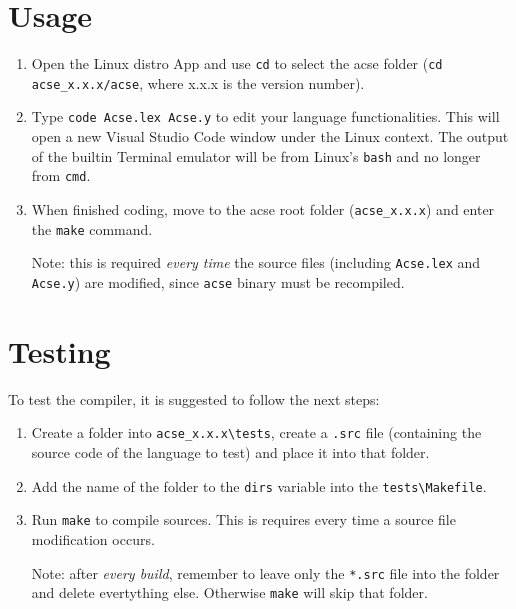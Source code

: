 \documentclass{article}
\begin{document}
\section{Usage}
\begin{enumerate}
  \item Open the Linux distro App and use \verb+cd+ to select the acse folder (\verb+cd acse_x.x.x/acse+, where x.x.x is the version number).
  \item Type \verb+code Acse.lex Acse.y+ to edit your language functionalities. This will open a new Visual Studio Code window under the Linux context. The output of the builtin Terminal emulator will be from Linux's \verb+bash+ and no longer from \verb+cmd+.
  \item When finished coding, move to the acse root folder (\verb+acse_x.x.x+) and enter the \verb+make+ command. \newline \newline \begin{small} Note: this is required \emph{every time} the source files (including \verb+Acse.lex+ and \verb+Acse.y+) are modified, since \verb+acse+ binary must be recompiled.\end{small}
\end{enumerate}
\section{Testing}
To test the compiler, it is suggested to follow the next steps:
\begin{enumerate}
  \item Create a folder into \verb+acse_x.x.x\tests+, create a \verb+.src+ file (containing the source code of the language to test) and place it into that folder.
  \item Add the name of the folder to the \verb+dirs+ variable into the \verb+tests\Makefile+.
  \item Run \verb+make+ to compile sources. This is requires every time a source file modification occurs.
\newline\newline \begin{small}Note: after \emph{every build}, remember to leave only the \verb+*.src+ file into the folder and delete evertything else. Otherwise \verb+make+ will skip that folder.\end{small}
\end{enumerate}
\end{document}
